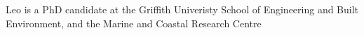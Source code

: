 \documentclass[a4paper,fleqn]{cas-sc}
\begin{document}

\section{}\label{}


%




\bio{}
Leo is a PhD candidate at the Griffith Univeristy School of Engineering and Built Environment, and the Marine and Coastal Research Centre
\endbio

\end{document}
